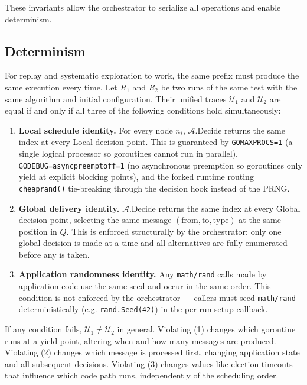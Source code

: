\documentclass[11pt]{article}
\begin{document}
These invariants allow the orchestrator to serialize all operations and enable determinism. 

\subsection{Determinism}

For replay and systematic exploration to work, the same prefix must produce the same execution every time. Let $R_1$ and $R_2$ be two runs of the same test with the same algorithm and initial configuration. Their unified traces $\mathcal{U}_1$ and $\mathcal{U}_2$ are equal if and only if all three of the following conditions hold simultaneously:

\begin{enumerate}[leftmargin=1.5em]
    \item \textbf{Local schedule identity.} For every node $n_i$, $\mathcal{A}.\text{Decide}$ returns the same index at every Local decision point. This is guaranteed by \texttt{GOMAXPROCS=1} (a single logical processor so goroutines cannot run in parallel), \texttt{GODEBUG=asyncpreemptoff=1} (no asynchronous preemption so goroutines only yield at explicit blocking points), and the forked runtime routing \texttt{cheaprand()} tie-breaking through the decision hook instead of the PRNG.

    \item \textbf{Global delivery identity.} $\mathcal{A}.\text{Decide}$ returns the same index at every Global decision point, selecting the same message $(\text{from}, \text{to}, \text{type})$ at the same position in $Q$. This is enforced structurally by the orchestrator: only one global decision is made at a time and all alternatives are fully enumerated before any is taken.

    \item \textbf{Application randomness identity.} Any \texttt{math/rand} calls made by application code use the same seed and occur in the same order. This condition is not enforced by the orchestrator --- callers must seed \texttt{math/rand} deterministically (e.g. \texttt{rand.Seed(42)}) in the per-run setup callback.
\end{enumerate}

If any condition fails, $\mathcal{U}_1 \neq \mathcal{U}_2$ in general. Violating (1) changes which goroutine runs at a yield point, altering when and how many messages are produced. Violating (2) changes which message is processed first, changing application state and all subsequent decisions. Violating (3) changes values like election timeouts that influence which code path runs, independently of the scheduling order.
\end{document}
